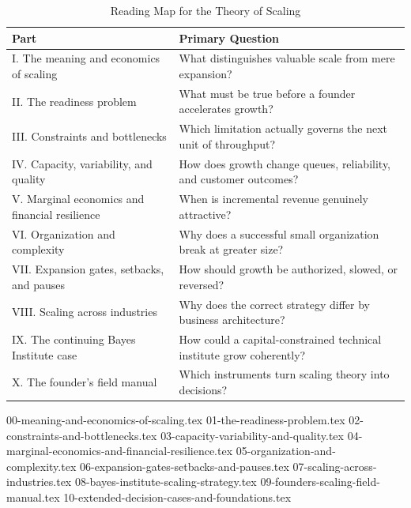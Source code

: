 \begin{table}[t]
\centering
\small
\caption{Reading Map for the Theory of Scaling}
\label{tab:ch27_reading_map}
\begin{tabularx}{\textwidth}{p{4.6cm} X}
\toprule
\textbf{Part} & \textbf{Primary Question} \\
\midrule
I. The meaning and economics of scaling & What distinguishes valuable scale from mere expansion? \\
II. The readiness problem & What must be true before a founder accelerates growth? \\
III. Constraints and bottlenecks & Which limitation actually governs the next unit of throughput? \\
IV. Capacity, variability, and quality & How does growth change queues, reliability, and customer outcomes? \\
V. Marginal economics and financial resilience & When is incremental revenue genuinely attractive? \\
VI. Organization and complexity & Why does a successful small organization break at greater size? \\
VII. Expansion gates, setbacks, and pauses & How should growth be authorized, slowed, or reversed? \\
VIII. Scaling across industries & Why does the correct strategy differ by business architecture? \\
IX. The continuing Bayes Institute case & How could a capital-constrained technical institute grow coherently? \\
X. The founder's field manual & Which instruments turn scaling theory into decisions? \\
\bottomrule
\end{tabularx}
\end{table}

{00-meaning-and-economics-of-scaling.tex}
{01-the-readiness-problem.tex}
{02-constraints-and-bottlenecks.tex}
{03-capacity-variability-and-quality.tex}
{04-marginal-economics-and-financial-resilience.tex}
{05-organization-and-complexity.tex}
{06-expansion-gates-setbacks-and-pauses.tex}
{07-scaling-across-industries.tex}
{08-bayes-institute-scaling-strategy.tex}
{09-founders-scaling-field-manual.tex}
{10-extended-decision-cases-and-foundations.tex}

